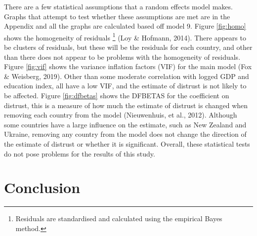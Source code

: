 \documentclass[
  11pt,
]{article}
\begin{document}
There are a few statistical assumptions that a random effects model makes. Graphs that attempt to test whether these assumptions are met are in the Appendix and all the graphs are calculated based off model 9. Figure \ref{fig:homo} shows the homogeneity of residuals \footnote{Residuals are standardised and calculated using the empirical Bayes method.} (Loy \& Hofmann, 2014). There appears to be clusters of residuals, but these will be the residuals for each country, and other than there does not appear to be problems with the homogeneity of residuals. Figure \ref{fig:vif} shows the variance inflation factors (VIF) for the main model (Fox \& Weisberg, 2019). Other than some moderate correlation with logged GDP and education index, all have a low VIF, and the estimate of distrust is not likely to be affected. Figure \ref{fig:dfbetas} shows the DFBETAS for the coefficient on distrust, this is a measure of how much the estimate of distrust is changed when removing each country from the model (Nieuwenhuis, et al., 2012). Although some countries have a large influence on the estimate, such as New Zealand and Ukraine, removing any country from the model does not change the direction of the estimate of distrust or whether it is significant. Overall, these statistical tests do not pose problems for the results of this study.\\

\hypertarget{conclusion}{%
\section{Conclusion}\label{conclusion}}
\end{document}

